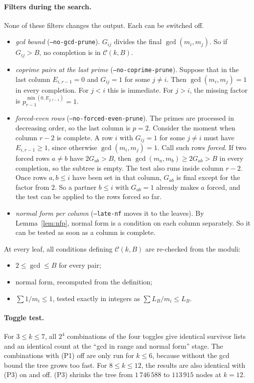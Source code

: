 \documentclass[11pt]{article}
\theoremstyle{definition}
\theoremstyle{remark}
\newcommand{\C}{\mathcal{C}}
\begin{document}
\paragraph{Filters during the search.}
None of these filters changes the output. Each can be switched off.
\begin{itemize}
\item[(P1)] \emph{gcd bound} (\texttt{--no-gcd-prune}). $G_{ij}$ divides the final
  $\gcd(m_i,m_j)$. So if $G_{ij}>B$, no completion is in $\C(k,B)$.
\item[(P2)] \emph{coprime pairs at the last prime} (\texttt{--no-coprime-prune}). Suppose that in
  the last column $E_{i,r-1}=0$ and $G_{ij}=1$ for some $j\ne i$. Then $\gcd(m_i,m_j)=1$ in every
  completion. For $j<i$ this is immediate. For $j>i$, the missing factor is
  $p_{r-1}^{\min(0,E_{j,r-1})}=1$.
\item[(P3)] \emph{forced-even rows} (\texttt{--no-forced-even-prune}). The primes are processed in
  decreasing order, so the last column is $p=2$. Consider the moment when column $r-2$ is
  complete. A row $i$ with $G_{ij}=1$ for some $j\ne i$ must have $E_{i,r-1}\ge1$, since
  otherwise $\gcd(m_i,m_j)=1$. Call such rows \emph{forced}. If two forced rows $a\ne b$ have
  $2G_{ab}>B$, then $\gcd(m_a,m_b)\ge2G_{ab}>B$ in every completion, so the subtree is empty.
  The test also runs inside column $r-2$. Once rows $a,b\le i$ have been set in that column,
  $G_{ab}$ is final except for the factor from $2$. So a partner $b\le i$ with $G_{ab}=1$ already
  makes $a$ forced, and the test can be applied to the rows forced so far.
\item[(NF)] \emph{normal form per column} (\texttt{--late-nf} moves it to the leaves). By
  Lemma~\ref{lem:nfp}, normal form is a condition on each column separately. So it can be
  tested as soon as a column is complete.
\end{itemize}
At every leaf, all conditions defining $\C(k,B)$ are re-checked from the moduli:
\begin{itemize}
\item $2\le\gcd\le B$ for every pair;
\item normal form, recomputed from the definition;
\item $\sum1/m_i\le1$, tested exactly in integers as $\sum L_B/m_i\le L_B$.
\end{itemize}

\paragraph{Toggle test.}
For $3\le k\le7$, all $2^4$ combinations of the four toggles give identical survivor lists and
an identical count at the ``gcd in range and normal form'' stage. The combinations with (P1) off
are only run for $k\le6$, because without the gcd bound the tree grows too fast. For
$8\le k\le12$, the results are also identical with (P3) on and off. (P3) shrinks the tree from
$1\,746\,588$ to $113\,915$ nodes at $k=12$.
\end{document}
